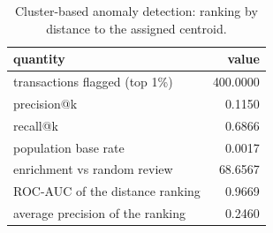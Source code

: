 \begin{table}[htbp]
\centering
\begin{tabular}{lr}
\toprule
quantity & value \\
\midrule
transactions flagged (top 1\%) & 400.0000 \\
precision@k & 0.1150 \\
recall@k & 0.6866 \\
population base rate & 0.0017 \\
enrichment vs random review & 68.6567 \\
ROC-AUC of the distance ranking & 0.9669 \\
average precision of the ranking & 0.2460 \\
\bottomrule
\end{tabular}
\caption{Cluster-based anomaly detection: ranking by distance to the assigned centroid.}
\label{tab:anomaly}
\end{table}
